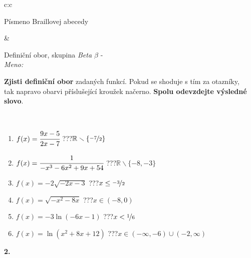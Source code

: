 \documentclass[10pt]{report}
\begin{document}
\begin{tabular}{c:c}
\begin{minipage}[c][104.5mm][t]{0.5\linewidth}
\begin{center}
\begin{minipage}{0.20\linewidth}
\begin{center}
{\small Písmeno Braillovej abecedy}
\end{center}
\end{minipage}
\end{center}
\end{minipage}
&
\begin{minipage}[c][104.5mm][t]{0.5\linewidth}
\begin{center}
\vspace{7mm}
{\huge Definiční obor, skupina \textit{Beta $\beta$} -}\\[5mm]
\textit{Meno:}\phantom{xxxxxxxxxxxxxxxxxxxxxxxxxxxxxxxxxxxxxxxxxxxxxxxxxxxxxxxxxxxxxxxxx}\\[5mm]
\begin{minipage}{0.95\linewidth}
\textbf{Zjisti definiční obor} zadaných funkcí. Pokud se shoduje s tím za otazníky,\\tak napravo obarvi příslušející kroužek načerno. \textbf{Spolu odevzdejte výsledné slovo}.
\end{minipage}
\\[1mm]
\begin{minipage}{0.79\linewidth}
\begin{center}
\begin{varwidth}{\linewidth}
\begin{enumerate}
\normalsizerrr
\item $f(x)=\cfrac{9x-5}{2x-7}$\quad \dotfill\; ???\;\dotfill \quad $\mathbb{R}\smallsetminus\{\nicefrac{-7}{2}\}$
\item $f(x)=\cfrac{1}{-x^3-6x^2+9x+54}$\quad \dotfill\; ???\;\dotfill \quad $\mathbb{R}\smallsetminus\{-8,-3\}$
\item $f(x)=-2\sqrt{-2x-3}$\quad \dotfill\; ???\;\dotfill \quad $x\leq\nicefrac{-3}{2}$
\item $f(x)=\sqrt{-x^2-8x}$\quad \dotfill\; ???\;\dotfill \quad $x\in(-8 , 0)$
\item $f(x)=-3\ln{(-6x-1)}$\quad \dotfill\; ???\;\dotfill \quad $x<\nicefrac{1}{6}$
\item $f(x)=\ln{(x^2+8x+12)}$\quad \dotfill\; ???\;\dotfill \quad $x\in(-\infty , -6)\cup(-2 , \infty)$
\end{enumerate}
\end{varwidth}
\end{center}
\end{minipage}
\begin{minipage}{0.20\linewidth}
\begin{center}
{\Huge\bfseries 2.} \\[2mm]

\end{center}
\end{minipage}
\end{center}
\end{minipage}
\end{tabular}
\end{document}
